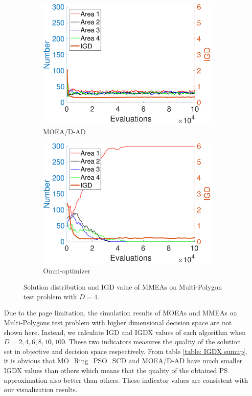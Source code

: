 \documentclass[conference]{IEEEtran}
\begin{document}
\begin{figure}[htbp]
    \begin{subfigure}[b]{.22\textwidth}
    \includegraphics[width=\linewidth]{Section5/dim4/Diversity/MOEADAD}
    \caption{MOEA/D-AD}
    \end{subfigure}
    \begin{subfigure}[b]{.22\textwidth}
    \includegraphics[width=\linewidth]{Section5/dim4/Diversity/OmniOptimizer}
    \caption{Omni-optimizer}
    \end{subfigure}
    \caption{Solution distribution and IGD value of MMEAs on Multi-Polygon test problem with $D=4$.}
    \label{fig: MMEAs Diversity dim=4}
\end{figure}

Due to the page limitation, the simulation results of MOEAs and MMEAs on Multi-Polygons test problem with higher dimensional decision space are not shown here. Instead, we calculate IGD and IGDX values of each algorithm when $D=2, 4, 6, 8, 10, 100$. These two indicators measures the quality of the solution set in objective and decision space respectively. From table \ref{table: IGDX sumup}, it is obvious that MO\_Ring\_PSO\_SCD and MOEA/D-AD have much smaller IGDX values than others which means that the quality of the obtained PS approximation also better than others. These indicator values are consistent with our visualization results.
\end{document}
